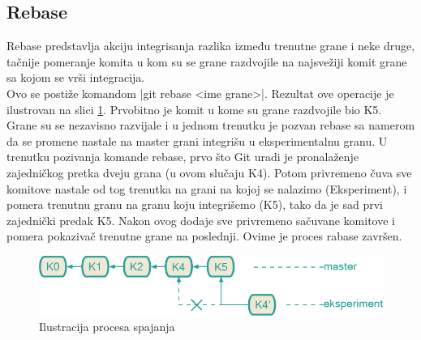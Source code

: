 \documentclass[a4paper]{article}
\begin{document}
{\subsection{Rebase}
\label{subsec:rebase}
Rebase predstavlja akciju integrisanja razlika između trenutne grane i neke druge, tačnije pomeranje komita u kom su se grane razdvojile na najsvežiji komit grane sa kojom se vrši integracija.\\
Ovo se postiže komandom |git rebase <ime grane>|. Rezultat ove operacije je ilustrovan na slici \ref{fig:rebase}. Prvobitno je komit u kome su grane razdvojile bio K5. Grane su se nezavisno razvijale i u jednom trenutku je pozvan rebase sa namerom da se promene nastale na master grani integrišu u eksperimentalnu granu. U trenutku pozivanja komande rebase, prvo što Git uradi je pronalaženje zajedničkog pretka dveju grana (u ovom slučaju K4). Potom privremeno čuva sve komitove nastale od tog trenutka na grani na kojoj se nalazimo (Eksperiment), i pomera trenutnu granu na granu koju integrišemo (K5), tako da je sad prvi zajednički predak K5. Nakon ovog dodaje sve privremeno sačuvane komitove i pomera pokazivač trenutne grane na poslednji. Ovime je proces rabase završen.
\begin{figure}[h!]
\begin{center}
\includegraphics[scale=0.3]{images/rebase.png}
\end{center}
\caption{Ilustracija procesa spajanja}
\label{fig:rebase}
\end{figure}

}
\end{document}
